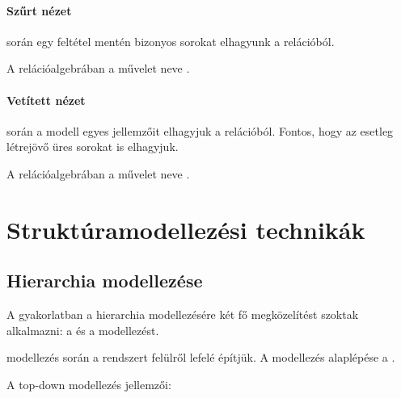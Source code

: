 \paragraph{Szűrt nézet}

\begin{definicio}
	 során egy feltétel mentén bizonyos sorokat elhagyunk a relációból. 
\end{definicio}

\begin{megjegyzes}
	A relációalgebrában a  művelet neve .
\end{megjegyzes}


\paragraph{Vetített nézet}

\begin{definicio}
	 során a modell egyes jellemzőit elhagyjuk a relációból. Fontos, hogy az esetleg létrejövő üres sorokat is elhagyjuk. 
\end{definicio}

\begin{megjegyzes}
	A relációalgebrában a  művelet neve .
\end{megjegyzes}


\section{Struktúramodellezési technikák}

\subsection{Hierarchia modellezése}

A gyakorlatban a hierarchia modellezésére két fő megközelítést szoktak alkalmazni: a  és a  modellezést.

\begin{definicio}
	 modellezés során a rendszert felülről lefelé építjük. A modellezés alaplépése a .
\end{definicio}

A top-down modellezés jellemzői:

